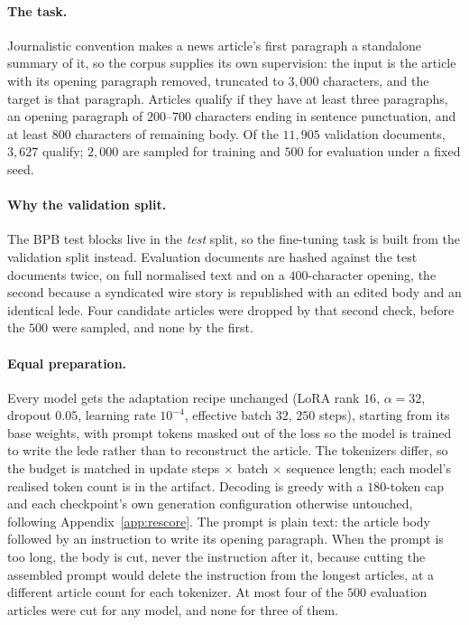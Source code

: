 \documentclass[10pt]{article}
\begin{document}
\paragraph{The task.} Journalistic convention makes a news article's first paragraph a standalone
summary of it, so the corpus supplies its own supervision: the input is the article with its opening
paragraph removed, truncated to $3{,}000$ characters, and the target is that paragraph. Articles
qualify if they have at least three paragraphs, an opening paragraph of $200$--$700$ characters
ending in sentence punctuation, and at least $800$ characters of remaining body. Of the $11{,}905$
validation documents, $3{,}627$ qualify; $2{,}000$ are sampled for training and $500$ for evaluation
under a fixed seed.

\paragraph{Why the validation split.} The BPB test blocks live in the \emph{test} split, so the
fine-tuning task is built from the validation split instead. Evaluation documents are hashed against
the test documents twice, on full normalised text and on a $400$-character opening, the second
because a syndicated wire story is republished with an edited body and an identical lede. Four
candidate articles were dropped by that second check, before the $500$ were sampled, and none by the
first.

\paragraph{Equal preparation.} Every model gets the adaptation recipe unchanged (LoRA rank $16$,
$\alpha{=}32$, dropout $0.05$, learning rate $10^{-4}$, effective batch $32$, $250$ steps), starting
from its base weights, with prompt tokens masked out of the loss so the model is trained to write
the lede rather than to reconstruct the article. The tokenizers differ, so the budget is matched in
update steps $\times$ batch $\times$ sequence length; each model's realised token count is in the
artifact. Decoding is greedy with a $180$-token cap and each checkpoint's own generation
configuration otherwise untouched, following Appendix~\ref{app:rescore}. The prompt is plain text:
the article body followed by an instruction to write its opening paragraph. When the prompt is too
long, the body is cut, never the instruction after it, because cutting the assembled prompt would
delete the instruction from the longest articles, at a different article count for each tokenizer.
At most four of the $500$ evaluation articles were cut for any model, and none for three of them.
\end{document}
